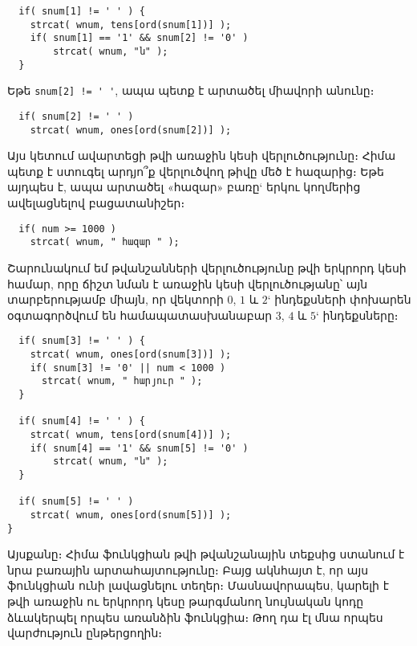 \begin{Verbatim}
  if( snum[1] != ' ' ) {
    strcat( wnum, tens[ord(snum[1])] );
    if( snum[1] == '1' && snum[2] != '0' )
        strcat( wnum, "ն" );
  }
\end{Verbatim}

Եթե \Verb|snum[2] != ' '|, ապա պետք է արտածել միավորի անունը։

\begin{Verbatim}
  if( snum[2] != ' ' )
    strcat( wnum, ones[ord(snum[2])] );
\end{Verbatim}

Այս կետում ավարտեցի թվի առաջին կեսի վերլուծությունը։ Հիմա պետք է
ստուգել արդյո՞ք վերլուծվող թիվը մեծ է հազարից։ Եթե այդպես է, ապա
արտածել «հազար» բառը` երկու կողմերից ավելացնելով բացատանիշեր։

\begin{Verbatim}
  if( num >= 1000 )
    strcat( wnum, " հազար " );
\end{Verbatim}

Շարունակում եմ թվանշանների վերլուծությունը թվի երկրորդ կեսի համար,
որը ճիշտ նման է առաջին կեսի վերլուծությանը՝ այն տարբերությամբ միայն,
որ  վեկտորի \(0\), \(1\) և \(2\)` ինդեքսների փոխարեն
օգտագործվում են համապատասխանաբար \(3\), \(4\) և \(5\)` ինդեքսները։

\begin{Verbatim}
  if( snum[3] != ' ' ) {
    strcat( wnum, ones[ord(snum[3])] );
    if( snum[3] != '0' || num < 1000 )
      strcat( wnum, " հարյուր " );
  }

  if( snum[4] != ' ' ) {
    strcat( wnum, tens[ord(snum[4])] );
    if( snum[4] == '1' && snum[5] != '0' )
        strcat( wnum, "ն" );
  }

  if( snum[5] != ' ' )
    strcat( wnum, ones[ord(snum[5])] );
}
\end{Verbatim}

Այսքանը։ Հիմա  ֆունկցիան թվի թվանշանային
տեքսից ստանում է նրա բառային արտահայտությունը։ Բայց ակնհայտ է, որ
այս ֆունկցիան ունի լավացնելու տեղեր։ Մասնավորապես, կարելի է թվի
առաջին ու երկրորդ կեսը թարգմանող նույնական կոդը ձևակերպել որպես
առանձին ֆունկցիա։ Թող դա էլ մնա որպես վարժություն ընթերցողին։
